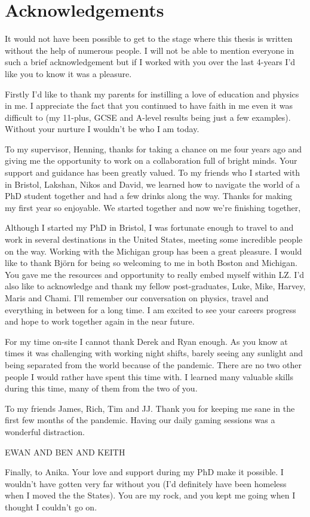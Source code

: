 %
%

\chapter*{Acknowledgements}
\begin{SingleSpace}
\par
It would not have been possible to get to the stage where this thesis is written without the help of numerous people.
I will not be able to mention everyone in such a brief acknowledgement but if I worked with you over the last 4-years I'd like you to know it was a pleasure.
\par
Firstly I'd like to thank my parents for instilling a love of education and physics in me. I appreciate the fact that you continued to have faith in me even it was difficult to (my 11-plus, GCSE and A-level results being just a few examples).
Without your nurture I wouldn't be who I am today.
\par
To my supervisor, Henning, thanks for taking a chance on me four years ago and giving me the opportunity to work on a collaboration full of bright minds. 
Your support and guidance has been greatly valued.
To my friends who I started with in Bristol, Lakshan, Nikos and David, we learned how to navigate the world of a PhD student together and had a few drinks along the way. 
Thanks for making my first year so enjoyable.
We started together and now we're finishing together,
\par
Although I started my PhD in Bristol, I was fortunate enough to travel  to and work in several destinations in the United States, meeting some incredible people on the way. Working with the Michigan group has been a great pleasure. 
I would like to thank Bj\"{o}rn for being so welcoming to me in both Boston and Michigan.
You gave me the resources and opportunity to really embed myself within LZ.
I'd also like to acknowledge and thank my fellow post-graduates, Luke, Mike, Harvey, Maris and Chami. I'll remember our conversation on physics, travel and everything in between for a long time. I am excited to see your careers progress and hope to work together again in the near future.
\par
For my time on-site I cannot thank Derek and Ryan enough. As you know at times it was challenging with working night shifts, barely seeing any sunlight and being separated from the world because of the pandemic. There are no two other people I would rather have spent this time with. I learned many valuable skills during this time, many of them from the two of you. 
\par
To my friends James, Rich, Tim and JJ.
Thank you for keeping me sane in the first few months of the pandemic.
Having our daily gaming sessions was a wonderful distraction.
\par
EWAN AND BEN AND KEITH
\par
Finally, to Anika.
Your love and support during my PhD make it possible.
I wouldn't have gotten very far without you (I'd definitely have been homeless when I moved the the States).
You are my rock, and you kept me going when I thought I couldn't go on.
\end{SingleSpace}
\clearpage